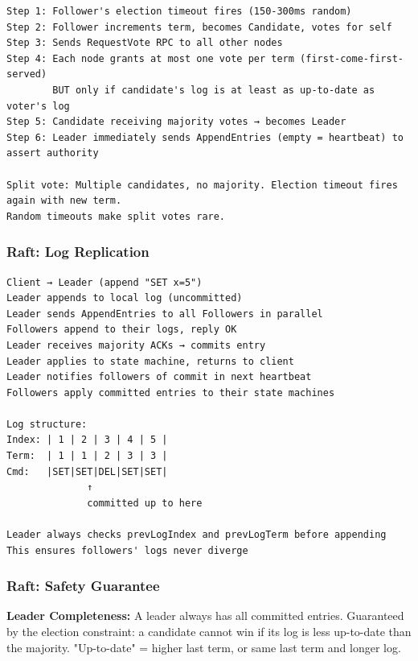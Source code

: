 \documentclass[11pt]{article}
\begin{document}
\setcodelang{}

\begin{verbatim}
Step 1: Follower's election timeout fires (150-300ms random)
Step 2: Follower increments term, becomes Candidate, votes for self
Step 3: Sends RequestVote RPC to all other nodes
Step 4: Each node grants at most one vote per term (first-come-first-served)
        BUT only if candidate's log is at least as up-to-date as voter's log
Step 5: Candidate receiving majority votes → becomes Leader
Step 6: Leader immediately sends AppendEntries (empty = heartbeat) to assert authority

Split vote: Multiple candidates, no majority. Election timeout fires again with new term.
Random timeouts make split votes rare.
\end{verbatim}

\subsubsection{Raft: Log Replication}\label{raft-log-replication}

\setcodelang{}

\begin{verbatim}
Client → Leader (append "SET x=5")
Leader appends to local log (uncommitted)
Leader sends AppendEntries to all Followers in parallel
Followers append to their logs, reply OK
Leader receives majority ACKs → commits entry
Leader applies to state machine, returns to client
Leader notifies followers of commit in next heartbeat
Followers apply committed entries to their state machines

Log structure:
Index: | 1 | 2 | 3 | 4 | 5 |
Term:  | 1 | 1 | 2 | 3 | 3 |
Cmd:   |SET|SET|DEL|SET|SET|
              ↑
              committed up to here

Leader always checks prevLogIndex and prevLogTerm before appending
This ensures followers' logs never diverge
\end{verbatim}

\subsubsection{Raft: Safety Guarantee}\label{raft-safety-guarantee}

\textbf{Leader Completeness:} A leader always has all committed entries. Guaranteed by the election constraint: a candidate cannot win if its log is less up-to-date than the majority. "Up-to-date" = higher last term, or same last term and longer log.
\end{document}
